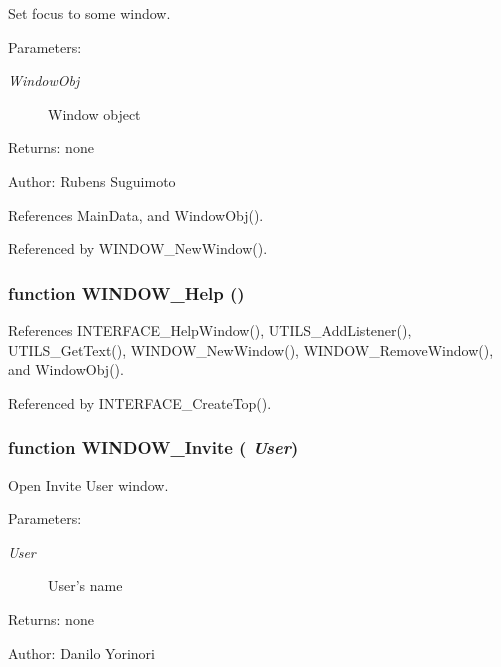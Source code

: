 Set focus to some window. 

\begin{Desc}
\item[Parameters:]
\begin{description}
\item[{\em WindowObj}]Window object \end{description}
\end{Desc}
\begin{Desc}
\item[Returns:]none \end{Desc}
\begin{Desc}
\item[Author:]Rubens Suguimoto \end{Desc}


References MainData, and WindowObj().

Referenced by WINDOW\_\-NewWindow().
\subsubsection[WINDOW\_\-Help]{\setlength{\rightskip}{0pt plus 5cm}function WINDOW\_\-Help ()}\label{window_2window_8js_dcaaab8438c3993a9195bec5503b7d5c}




References INTERFACE\_\-HelpWindow(), UTILS\_\-AddListener(), UTILS\_\-GetText(), WINDOW\_\-NewWindow(), WINDOW\_\-RemoveWindow(), and WindowObj().

Referenced by INTERFACE\_\-CreateTop().
\subsubsection[WINDOW\_\-Invite]{\setlength{\rightskip}{0pt plus 5cm}function WINDOW\_\-Invite ( {\em User})}\label{window_2window_8js_a0b254ab6a166342fef8e2ff561e155d}


Open Invite User window. 

\begin{Desc}
\item[Parameters:]
\begin{description}
\item[{\em User}]User's name \end{description}
\end{Desc}
\begin{Desc}
\item[Returns:]none \end{Desc}
\begin{Desc}
\item[Author:]Danilo Yorinori \end{Desc}


